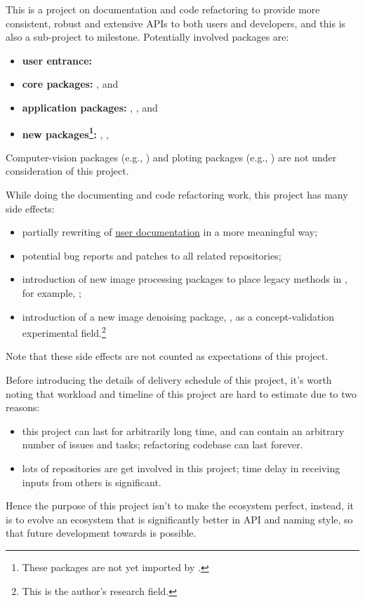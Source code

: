 This is a project on documentation and code refactoring to provide more consistent, robust and extensive APIs to both users and developers, and this is also a sub-project to \images{}  milestone. Potentially involved packages are:
\begin{itemize}
    \item \textbf{user entrance:} \repoimages
    \item \textbf{core packages:} \repoimagecore, \repoimageaxes and \repoimagemetadata
    \item \textbf{application packages:} \repoimagemorphology, \repoimagetransformations, \repoimagedistance and \repoimagefiltering
    \item \textbf{new packages\footnote{These packages are not yet imported by \images.}:} \repoimagebinarization, \repohistogramthresholding, \repoimageinpainting
\end{itemize}
Computer-vision packages (e.g., \repoimagetracking) and ploting packages (e.g., \repoimageview) are not under consideration of this project.\par

While doing the documenting and code refactoring work, this project has many side effects:
\begin{itemize}
    \item partially rewriting of \href{https://juliaimages.org}{user documentation} in a more meaningful way;
    \item potential bug reports and patches to all related \langjulia repositories;
    \item introduction of new image processing packages to place legacy methods in \images, for example, ;
    \item introduction of a new image denoising package, \repoimagenoise, as a concept-validation experimental field.\footnote{This is the author's research field.}
\end{itemize}
Note that these side effects are not counted as expectations of this project.\par

Before introducing the details of delivery schedule of this project, it's worth noting that workload and timeline of this project are hard to estimate due to two reasons:
\begin{itemize}
    \item this project can last for arbitrarily long time, and can contain an arbitrary number of issues and tasks; refactoring codebase can last forever.
    \item lots of repositories are get involved in this project; time delay in receiving inputs from others is significant.
\end{itemize}
Hence the purpose of this project isn't to make the ecosystem perfect, instead, it is to evolve an ecosystem that is significantly better in API and naming style, so that future development towards \images{}  is possible.
